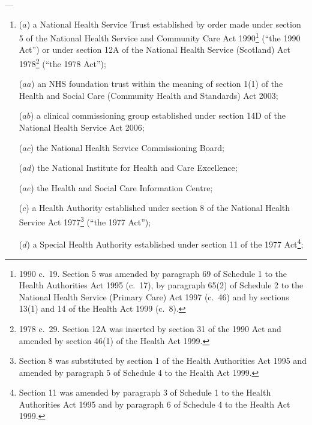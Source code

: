 \documentclass[12pt,a4paper]{article}
\begin{document}
\begin{sloppypar}
—
\end{sloppypar}
\begin{enumerate}\item[]
($a$) a National Health Service Trust established by order made under section 5 of the National Health Service and Community Care Act 1990\footnote{1990 c.\ 19. Section 5 was amended by paragraph 69 of Schedule 1 to the Health Authorities Act 1995 (c.\ 17), by paragraph 65(2) of Schedule 2 to the National Health Service (Primary Care) Act 1997 (c.\ 46) and by sections 13(1) and 14 of the Health Act 1999 (c.\ 8).} (“the 1990 Act”) or under section 12A of the National Health Service (Scotland) Act 1978\footnote{1978 c.\ 29. Section 12A was inserted by section 31 of the 1990 Act and amended by section 46(1) of the Health Act 1999.} (“the 1978 Act”);

($aa$) an NHS foundation trust within the meaning of section 1(1) of the Health and Social Care (Community Health and Standards) Act 2003;

($ab$) a clinical commissioning group established under section 14D of the National Health Service Act 2006;

($ac$) the National Health Service Commissioning Board;

($ad$) the National Institute for Health and Care Excellence;

($ae$) the Health and Social Care Information Centre;


($c$) a Health Authority established under section 8 of the National Health Service Act 1977\footnote{Section 8 was substituted by section 1 of the Health Authorities Act 1995 and amended by paragraph 5 of Schedule 4 to the Health Act 1999.} (“the 1977 Act”);

($d$) a Special Health Authority established under section 11 of the 1977 Act\footnote{Section 11 was amended by paragraph 3 of Schedule 1 to the Health Authorities Act 1995 and by paragraph 6 of Schedule 4 to the Health Act 1999.};


\end{enumerate}
\end{document}
